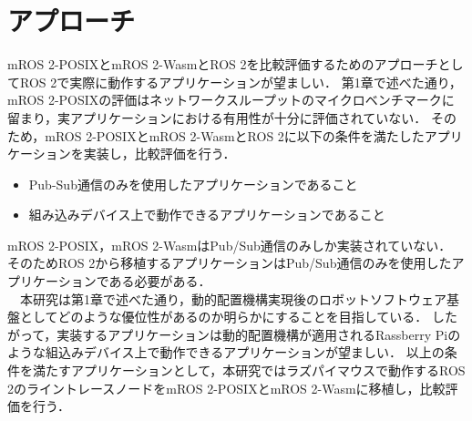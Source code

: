 \chapter{アプローチ}
\label{chap:aproach}
mROS 2-POSIXとmROS 2-WasmとROS 2を比較評価するためのアプローチとしてROS 2で実際に動作するアプリケーションが望ましい．
第1章で述べた通り，mROS 2-POSIXの評価はネットワークスループットのマイクロベンチマークに留まり，実アプリケーションにおける有用性が十分に評価されていない．
そのため，mROS 2-POSIXとmROS 2-WasmとROS 2に以下の条件を満たしたアプリケーションを実装し，比較評価を行う．
\begin{itemize}
    \item Pub-Sub通信のみを使用したアプリケーションであること
    \item 組み込みデバイス上で動作できるアプリケーションであること
\end{itemize}
mROS 2-POSIX，mROS 2-WasmはPub/Sub通信のみしか実装されていない．
そのためROS 2から移植するアプリケーションはPub/Sub通信のみを使用したアプリケーションである必要がある．
\\　本研究は第1章で述べた通り，動的配置機構実現後のロボットソフトウェア基盤としてどのような優位性があるのか明らかにすることを目指している．
したがって，実装するアプリケーションは動的配置機構が適用されるRassberry Piのような組込みデバイス上で動作できるアプリケーションが望ましい．
以上の条件を満たすアプリケーションとして，本研究ではラズパイマウスで動作するROS 2のライントレースノードをmROS 2-POSIXとmROS 2-Wasmに移植し，比較評価を行う．
